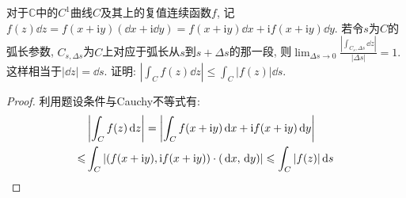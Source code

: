 \begin{quizb}
\woe 对于\(\mathbb{C}\)中的\(C^1\)曲线\(C\)及其上的复值连续函数\(f\), 记\(f(z)\dd z=f(x+\mathrm{i}y)(\dd x+\mathrm{i}\dd y)=f(x+\mathrm{i}y)\dd x+\mathrm{i}f(x+\mathrm{i}y)\dd y\). 若令\(s\)为\(C\)的弧长参数, \(C_{s,\Delta s}\)为\(C\)上对应于弧长从\(s\)到\(s+\Delta s\)的那一段, 则\(\lim_{\Delta s\rightarrow 0}\frac{\left|\int_{C_s,\Delta s}\dd z\right|}{|\Delta s|}=1.\)这样相当于\(|\dd z|=\dd s\). 证明: \(\left|\int_C f(z)\dd z\right|\leqslant \int_C|f(z)|\dd s\). 
\begin{proof}
利用题设条件与Cauchy不等式有:\[\begin{split}
&\left|\int_Cf(z)\,\mathrm{d} z\right|=\left|\int_C f(x+\mathrm{i}y)\,\mathrm{d} x+\mathrm{i}f(x+\mathrm{i}y)\,\mathrm{d} y\right|\\
\leqslant&\int_C\left|\left(f(x+\mathrm{i}y),\mathrm{i}f(x+\mathrm{i}y)\right)\cdot (\,\mathrm{d} x,\,\mathrm{d} y)\right|\leqslant\int_C|f(z)|\,\mathrm{d} s \qedhere
\end{split}\]
\end{proof}
\end{quizb}

